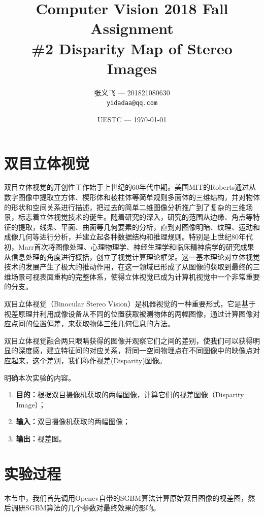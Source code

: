 \documentclass[]{article}
\title{Computer Vision 2018 Fall Assignment \\ \textbf{\#2 Disparity Map of Stereo Images}}
\author{张义飞 --- 201821080630\\ \texttt{yidadaa@qq.com}}
\date{\small{UESTC --- \today}}
\begin{document}
    \maketitle

    \section{双目立体视觉}
    双目立体视觉的开创性工作始于上世纪的60年代中期。美国MIT的Roberts通过从数字图像中提取立方体、楔形体和棱柱体等简单规则多面体的三维结构，并对物体的形状和空间关系进行描述，把过去的简单二维图像分析推广到了复杂的三维场景，标志着立体视觉技术的诞生。随着研究的深入，研究的范围从边缘、角点等特征的提取，线条、平面、曲面等几何要素的分析，直到对图像明暗、纹理、运动和成像几何等进行分析，并建立起各种数据结构和推理规则。特别是上世纪80年代初，Marr首次将图像处理、心理物理学、神经生理学和临床精神病学的研究成果从信息处理的角度进行概括，创立了视觉计算理论框架。这一基本理论对立体视觉技术的发展产生了极大的推动作用，在这一领域已形成了从图像的获取到最终的三维场景可视表面重构的完整体系，使得立体视觉已成为计算机视觉中一个非常重要的分支。

    双目立体视觉（Binocular Stereo Vision）是机器视觉的一种重要形式，它是基于视差原理并利用成像设备从不同的位置获取被测物体的两幅图像，通过计算图像对应点间的位置偏差，来获取物体三维几何信息的方法。

    双目立体视觉融合两只眼睛获得的图像并观察它们之间的差别，使我们可以获得明显的深度感，建立特征间的对应关系，将同一空间物理点在不同图像中的映像点对应起来，这个差别，我们称作视差(Disparity)图像。
    \begin{question}
        明确本次实验的内容。
        \begin{enumerate}
            \item \textbf{目的：}根据双目摄像机获取的两幅图像，计算它们的视差图像（Disparity Image）；
            \item \textbf{输入：}双目摄像机获取的两幅图像；
            \item \textbf{输出：}视差图。
        \end{enumerate}
    \end{question}

    \section{实验过程}
    本节中，我们首先调用Opencv自带的SGBM算法计算原始双目图像的视差图，然后调研SGBM算法的几个参数对最终效果的影响。
\end{document}
